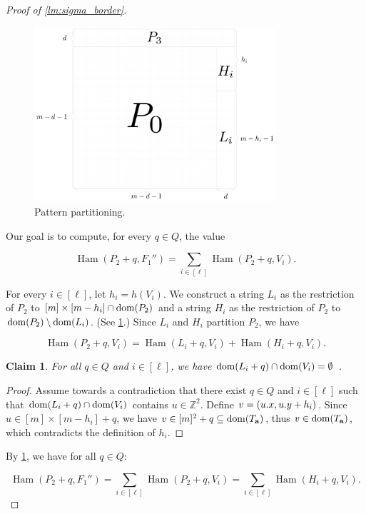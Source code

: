 \documentclass[twoside,leqno]{article}
\let\Cref\cref
\newtheorem{claim}{Claim}[section]
\newcommand{\Z}{\mathbb{Z}}
\newcommand{\Ta}{T_\mathbf{a}}
\DeclareMathOperator*{\Ham}{Ham}
\begin{document}
\begin{proof}[{Proof of \cref{lm:sigma_border}}]
\begin{figure}[!t]
	\begin{center}
		\includegraphics[width=0.8\textwidth]{drawings/pattern_restriction}
	\end{center}
	\caption{Pattern partitioning.}
	\label{figure:pattern_restriction}
\end{figure}

Our goal is to compute, for every $q \in Q$, the value

\[ \Ham(P_2 + q, F_1'') = \sum_{i \in [\ell]} \Ham(P_2 + q, V_i).\]

For every $i \in [\ell]$, let $h_i = h(V_i)$. We construct a string $L_i$ as the restriction of $P_2$ to $[m] \times [m - h_i] \cap \operatorname*{dom}(P_2)$ and a string $H_i$ as the restriction of $P_2$ to $\operatorname*{dom}(P_2) \setminus \operatorname*{dom}(L_i)$. (See \Cref{figure:pattern_restriction}.) Since $L_i$ and $H_i$ partition $P_2$, we have

\[\Ham(P_2 + q, V_i) = \Ham(L_i + q, V_i) + \Ham(H_i + q, V_i). \]

\begin{claim}\label{pattern_height_reduction}
For all $q \in Q$ and $i \in [\ell]$, we have $\operatorname*{dom}(L_i + q) \cap \operatorname*{dom}(V_i) = \emptyset$ .
\end{claim}
\begin{proof}
Assume towards a contradiction that there exist $q \in Q$ and $i \in [\ell]$ such that $\operatorname*{dom}(L_i + q) \cap \operatorname*{dom}(V_i)$ contains $u \in \Z^2$. Define $v = (u.x, u.y + h_i)$.
Since $u \in [m] \times [m - h_i] + q$, we have $v \in [m]^2 + q \subseteq \d{\Ta}$, thus $v \in \d{\Ta}$, which contradicts the definition of $h_i$.
\end{proof}

By \Cref{pattern_height_reduction}, we have for all $q \in Q$:

\[\Ham(P_2 + q, F_1'') = \sum_{i \in [\ell]} \Ham(P_2 + q, V_i) = \sum_{i \in [\ell]} \Ham(H_i + q, V_i). \]


\end{proof}
\end{document}
